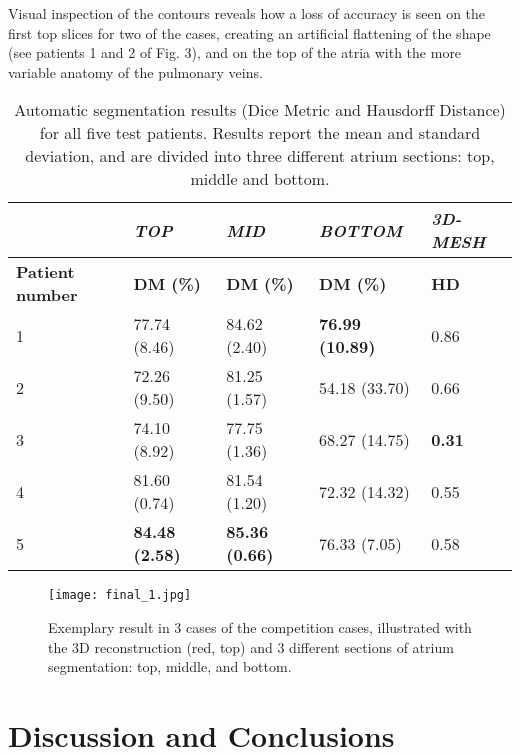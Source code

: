 \documentclass{llncs}
\begin{document}
Visual inspection of the contours reveals how a loss of accuracy is seen on the first top slices for two of the cases, creating an artificial flattening of the shape (see patients 1 and 2 of Fig. 3), and on the top of the atria with the more variable anatomy of the pulmonary veins.

\begin{table}[]
\centering
\begin{tabular}{|l|l|l|l|l|}
\hline
                        & \textit{\textbf{TOP}}  & \textit{\textbf{MID}} &  \textit{\textbf{BOTTOM}}   & \textit{\textbf{3D-MESH}} \\ \hline
\textbf{Patient number} & \textbf{DM (\%)}       & \textbf{DM (\%)}      & \textbf{DM (\%)}       & \textbf{HD}          \\ \hline
1                       &  77.74 (8.46)           & 84.62 (2.40)          &   \textbf{76.99 (10.89)}   & 0.86                      \\ \hline
2                       &  72.26 (9.50)           & 81.25 (1.57)          &   54.18 (33.70)            & 0.66                      \\ \hline
3                       &74.10 (8.92)             & 77.75 (1.36)          &   68.27 (14.75)           & \textbf{0.31}             \\ \hline
4                       & 81.60 (0.74)            & 81.54 (1.20)          &   72.32 (14.32)        & 0.55                      \\ \hline
5                       &\textbf{84.48 (2.58)}    & \textbf{85.36 (0.66)} &   76.33 (7.05)  & 0.58                      \\ \hline
\end{tabular}
\newline
\caption{Automatic segmentation results (Dice Metric and Hausdorff Distance) for all five test patients. Results report the mean and standard deviation, and are divided into three different atrium sections: top, middle and bottom.}
\end{table}

\begin{figure*}[ht]
\centering
 \texttt{[image: final\_1.jpg]}
   \caption{Exemplary result in 3 cases of the competition cases, illustrated with the 3D reconstruction (red, top) and 3 different sections of atrium segmentation: top, middle, and bottom.}
\label{fig:final_1}
\end{figure*}

\section{Discussion and Conclusions}
\end{document}
